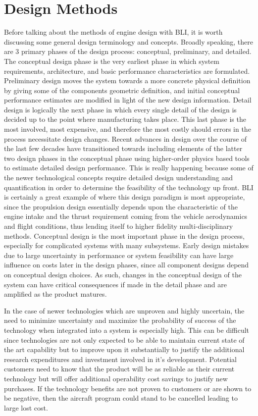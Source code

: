 \documentclass[12pt]{gatech-thesis}
\begin{document}
\section{Design Methods}
Before talking about the methods of engine design with BLI, it is worth discussing some general design terminology and concepts. Broadly speaking, there are 3 primary phases of the design process: conceptual, preliminary, and detailed. The conceptual design phase is the very earliest phase in which system requirements, architecture, and basic performance characteristics are formulated. Preliminary design moves the system towards a more concrete physical definition by giving some of the components geometric definition, and initial conceptual performance estimates are modified in light of the new design information. Detail design is logically the next phase in which every single detail of the design is decided up to the point where manufacturing takes place. This last phase is the most involved, most expensive, and therefore the most costly should errors in the process necessitate design changes. Recent advances in design over the course of the last few decades have transitioned towards including elements of the latter two design phases in the conceptual phase using higher-order physics based tools to estimate detailed design performance. This is really happening because some of the newer technological concepts require detailed design understanding and quantification in order to determine the feasibility of the technology up front.  BLI is certainly a great example of where this design paradigm is most appropriate, since the propulsion design essentially depends upon the characteristic of the engine intake and the thrust requirement coming from the vehicle aerodynamics and flight conditions, thus lending itself to higher fidelity multi-disciplinary methods.  Conceptual design is the most important phase in the design process, especially for complicated systems with many subsystems.  Early design mistakes due to large uncertainty in performance or system feasibility can have large influence on costs later in the design phases, since all component designs depend on conceptual design choices. As such, changes in the conceptual  design of the system can have critical consequences if made in the detail phase and are amplified as the product matures.  

In the case of newer technologies which are unproven and highly uncertain, the need to minimize uncertainty and maximize the probability of success of the technology when integrated into a system is especially high. This can be difficult since technologies are not only expected to be able to maintain current state of the art capability but to improve upon it substantially to justify the additional research expenditures and investment involved in it's development.  Potential customers need to know that the product will be as reliable as their current technology but will offer additional operability cost savings to justify new purchases. If the technology benefits are not proven to customers or are shown to be negative, then the aircraft program could stand to be cancelled leading to large lost cost.  
\end{document}
